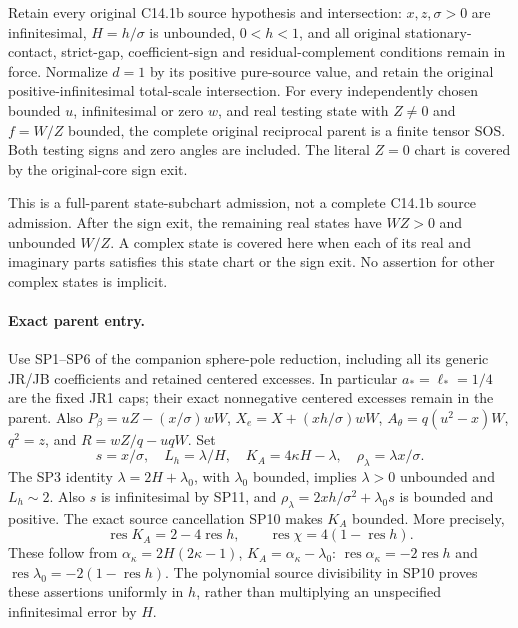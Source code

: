 \begin{theorem}
Retain every original C14.1b source hypothesis and intersection:
$x,z,\sigma>0$ are infinitesimal, $H=h/\sigma$ is unbounded,
$0<h<1$, and all original stationary-contact, strict-gap,
coefficient-sign and residual-complement conditions remain in force.
Normalize $d=1$ by its positive pure-source value, and retain the
original positive-infinitesimal total-scale intersection.
For every independently chosen bounded $u$, infinitesimal or zero $w$,
and real testing state with $Z\ne0$ and $f=W/Z$ bounded, the complete
original reciprocal parent is a finite tensor SOS. Both testing signs
and zero angles are included. The literal $Z=0$ chart is covered by
the original-core sign exit.
\end{theorem}

This is a full-parent state-subchart admission, not a complete C14.1b
source admission. After the sign exit, the remaining real states have
$WZ>0$ and unbounded $W/Z$. A complex state is covered here when
each of its real and imaginary parts satisfies this state chart or
the sign exit. No assertion for other complex states is implicit.

\paragraph{Exact parent entry.}
Use SP1--SP6 of the companion sphere-pole reduction, including all its
generic JR/JB coefficients and retained centered excesses. In particular
$a_*=\ell_*=1/4$ are the fixed JR1 caps; their exact nonnegative
centered excesses remain in the parent. Also
$P_\beta=uZ-(x/\sigma)wW$, $X_e=X+(xh/\sigma)wW$,
$A_\theta=q(u^2-x)W$, $q^2=z$, and $R=wZ/q-uqW$.
Set
\[
 s=x/\sigma,\quad L_h=\lambda/H,\quad
 K_A=4\kappa H-\lambda,\quad \rho_\lambda=\lambda x/\sigma.
\]
The SP3 identity $\lambda=2H+\lambda_0$, with $\lambda_0$ bounded,
implies $\lambda>0$ unbounded and $L_h\sim2$.
Also $s$ is infinitesimal by SP11, and
$\rho_\lambda=2xh/\sigma^2+\lambda_0s$ is bounded and positive.
The exact source cancellation SP10 makes $K_A$ bounded. More precisely,
\[
 \operatorname{res}K_A=2-4\operatorname{res}h,\qquad
 \operatorname{res}\chi=4(1-\operatorname{res}h).
 \tag{BS1}
\]
These follow from $\alpha_\kappa=2H(2\kappa-1)$,
$K_A=\alpha_\kappa-\lambda_0$:
$\operatorname{res}\alpha_\kappa=-2\operatorname{res}h$ and
$\operatorname{res}\lambda_0=-2(1-\operatorname{res}h)$.
The polynomial source divisibility in SP10 proves these assertions
uniformly in $h$, rather than multiplying an unspecified infinitesimal
error by $H$.

